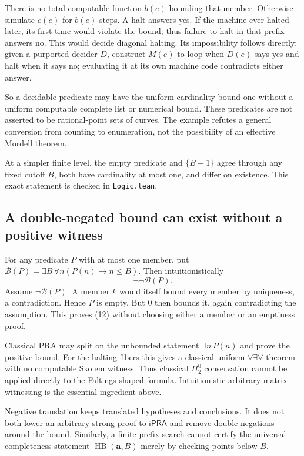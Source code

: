 \documentclass[11pt,letterpaper]{article}
\newcommand{\iPRA}{\mathsf{iPRA}}
\newcommand{\HB}{\operatorname{HB}}
\theoremstyle{definition}
\begin{document}
There is no total computable function $b(e)$ bounding that member.
Otherwise simulate $e(e)$ for $b(e)$ steps. A halt answers yes.
If the machine ever halted later, its first time would violate the bound;
thus failure to halt in that prefix answers no. This would decide diagonal
halting. Its impossibility follows directly: given a purported decider
$D$, construct $M(e)$ to loop when $D(e)$ says yes and halt when it
says no; evaluating it at its own machine code contradicts either answer.

So a decidable predicate may have the uniform cardinality bound one
without a uniform computable complete list or numerical bound.
These predicates are not asserted to be rational-point sets of curves.
The example refutes a general conversion from counting to enumeration,
not the possibility of an effective Mordell theorem.

At a simpler finite level, the empty predicate and $\{B+1\}$ agree
through any fixed cutoff $B$, both have cardinality at most one, and
differ on existence. This exact statement is checked in \texttt{Logic.lean}.

\subsection{A double-negated bound can exist without a positive witness}
For any predicate $P$ with at most one member, put
$\mathcal B(P)=\exists B\,\forall n(P(n)\to n\leq B)$.
Then intuitionistically
\[
                      \neg\neg\mathcal B(P).             \tag{12}
\]
Assume $\neg\mathcal B(P)$. A member $k$ would itself bound every member
by uniqueness, a contradiction. Hence $P$ is empty. But $0$ then bounds
it, again contradicting the assumption. This proves (12) without choosing
either a member or an emptiness proof.

Classical PRA may split on the unbounded statement $\exists n\,P(n)$
and prove the positive bound. For the halting fibers this gives a
classical uniform $\forall\exists\forall$ theorem with no computable
Skolem witness. Thus classical $\Pi^0_2$ conservation cannot be applied
directly to the Faltings-shaped formula. Intuitionistic arbitrary-matrix
witnessing is the essential ingredient above.

Negative translation keeps translated hypotheses and conclusions.
It does not both lower an arbitrary strong proof to $\iPRA$ and
remove double negations around the bound. Similarly, a finite prefix
search cannot certify the universal completeness statement
$\HB(\mathbf a,B)$ merely by checking points below $B$.
\end{document}
